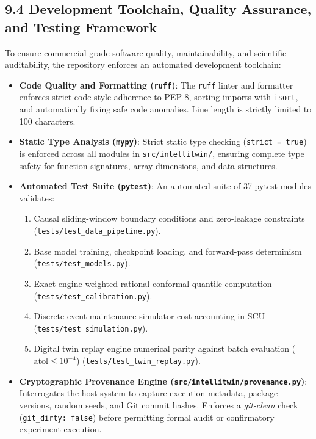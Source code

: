 \documentclass[12pt,a4paper]{article}
\begin{document}
\subsection*{9.4 Development Toolchain, Quality Assurance, and Testing Framework}
To ensure commercial-grade software quality, maintainability, and scientific auditability, the repository enforces an automated development toolchain:
\begin{itemize}
    \item \textbf{Code Quality and Formatting (\texttt{ruff})}: The \texttt{ruff} linter and formatter enforces strict code style adherence to PEP 8, sorting imports with \texttt{isort}, and automatically fixing safe code anomalies. Line length is strictly limited to 100 characters.
    \item \textbf{Static Type Analysis (\texttt{mypy})}: Strict static type checking (\texttt{strict = true}) is enforced across all modules in \texttt{src/intellitwin/}, ensuring complete type safety for function signatures, array dimensions, and data structures.
    \item \textbf{Automated Test Suite (\texttt{pytest})}: An automated suite of 37 pytest modules validates:
    \begin{enumerate}
        \item Causal sliding-window boundary conditions and zero-leakage constraints (\texttt{tests/test\_data\_pipeline.py}).
        \item Base model training, checkpoint loading, and forward-pass determinism (\texttt{tests/test\_models.py}).
        \item Exact engine-weighted rational conformal quantile computation (\texttt{tests/test\_calibration.py}).
        \item Discrete-event maintenance simulator cost accounting in SCU (\texttt{tests/test\_simulation.py}).
        \item Digital twin replay engine numerical parity against batch evaluation ($\text{atol} \le 10^{-4}$) (\texttt{tests/test\_twin\_replay.py}).
    \end{enumerate}
    \item \textbf{Cryptographic Provenance Engine (\texttt{src/intellitwin/provenance.py})}: Interrogates the host system to capture execution metadata, package versions, random seeds, and Git commit hashes. Enforces a \textit{git-clean} check (\texttt{git\_dirty: false}) before permitting formal audit or confirmatory experiment execution.
\end{itemize}
\end{document}
